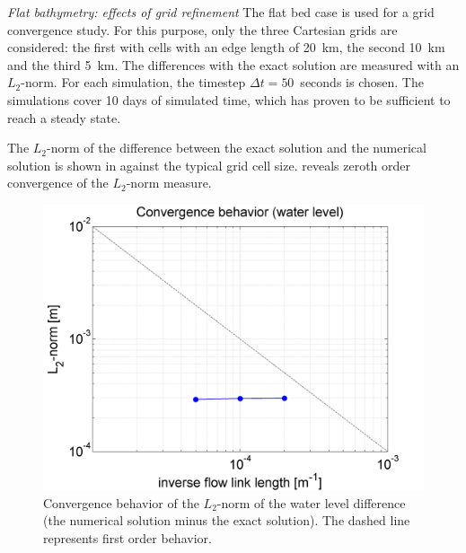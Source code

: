 \emph{Flat bathymetry: effects of grid refinement}\newline
The flat bed case is used for a grid convergence study. For this purpose, only the three Cartesian grids are considered: the first with cells with an edge length of 20~km, the second 10~km and the third 5~km. The differences with the exact solution are measured with an $L_2$-norm. For each simulation, the timestep $\Delta t = 50$~seconds is chosen. The simulations cover 10 days of simulated time, which has proven to be sufficient to reach a steady state. 

The $L_2$-norm of the difference between the exact solution and the numerical solution is shown in  against the typical grid cell size.  reveals zeroth order convergence of the $L_2$-norm measure.

\begin{figure}[h!]
\begin{center}
\includegraphics[width=0.55\columnwidth]{figures/coriolisstraightconvergence.png}
\end{center}\caption{Convergence behavior of the $L_2$-norm of the water level difference (the numerical solution minus the exact solution). The dashed line represents first order behavior. \label{fig:resultscoriolisconvergence}}
\end{figure}





